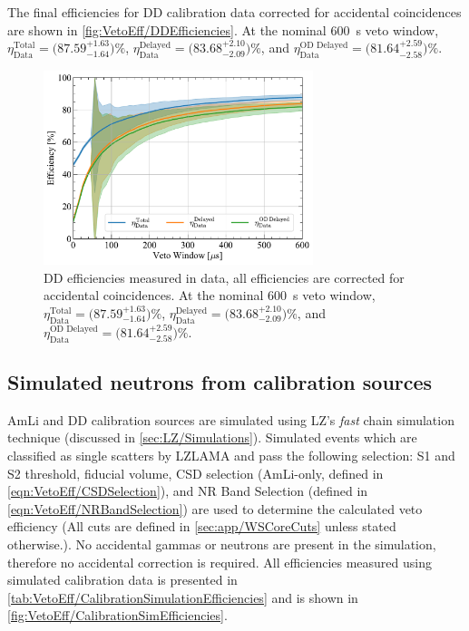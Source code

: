 The final efficiencies for DD calibration data corrected for accidental coincidences are shown in \autoref{fig:VetoEff/DDEfficiencies}. At the nominal 600~\textmu s veto window, $\eta^\text{Total}_\text{Data}=\big(87.59^{+1.63}_{-1.64}\big)\%$, $\eta^\text{Delayed}_\text{Data}=\big(83.68^{+2.10}_{-2.09}\big)\%$, and $\eta^\text{OD Delayed}_\text{Data}=\big(81.64^{+2.59}_{-2.58}\big)\%$.

\begin{figure}[ht!]
    \centering
    \includegraphics[width=0.7\textwidth]{figures/VetoEfficiency/DDEfficiencies_Data.pdf}
    \caption[DD efficiencies measured in data, all efficiencies are corrected for accidental coincidences.]{DD efficiencies measured in data, all efficiencies are corrected for accidental coincidences. At the nominal 600~\textmu s veto window, $\eta^\text{Total}_\text{Data}=\big(87.59^{+1.63}_{-1.64}\big)\%$, $\eta^\text{Delayed}_\text{Data}=\big(83.68^{+2.10}_{-2.09}\big)\%$, and $\eta^\text{OD Delayed}_\text{Data}=\big(81.64^{+2.59}_{-2.58}\big)\%$.}
    \label{fig:VetoEff/DDEfficiencies}
\end{figure}
\pagebreak
\subsection{Simulated neutrons from calibration sources}
AmLi and DD calibration sources are simulated using LZ's \textit{fast} chain simulation technique (discussed in \autoref{sec:LZ/Simulations}). Simulated events which are classified as single scatters by LZLAMA and pass the following selection: S1 and S2 threshold, fiducial volume, CSD selection (AmLi-only, defined in \autoref{eqn:VetoEff/CSDSelection}), and NR Band Selection (defined in \autoref{eqn:VetoEff/NRBandSelection}) are used to determine the calculated veto efficiency (All cuts are defined in \autoref{sec:app/WSCoreCuts} unless stated otherwise.). 
No accidental gammas or neutrons are present in the simulation, therefore no accidental correction is required. All efficiencies measured using simulated calibration data is presented in \autoref{tab:VetoEff/CalibrationSimulationEfficiencies} and is shown in \autoref{fig:VetoEff/CalibrationSimEfficiencies}.

